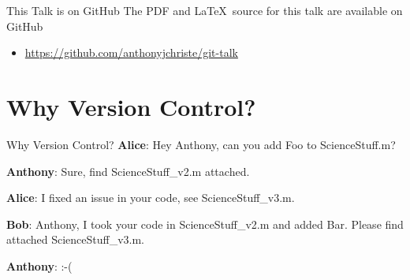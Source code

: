 \documentclass{beamer}
\begin{document}
    \begin{frame}{This Talk is on GitHub}
        The PDF and \LaTeX~source for this talk are available on GitHub
        \begin{itemize}
            \item \url{https://github.com/anthonyjchriste/git-talk}
        \end{itemize}
    \end{frame}

    \section{Why Version Control?}\label{sec:why-version-control?}
    \begin{frame}{Why Version Control?}
        \textbf{Alice}: Hey Anthony, can you add Foo to ScienceStuff.m?

        \textbf{Anthony}: Sure, find ScienceStuff\_v2.m attached.

        \textbf{Alice}: I fixed an issue in your code, see ScienceStuff\_v3.m.

        \textbf{Bob}: Anthony, I took your code in ScienceStuff\_v2.m and added Bar. Please find attached ScienceStuff\_v3.m.

        \textbf{Anthony}: :-(
    \end{frame}
\end{document}
